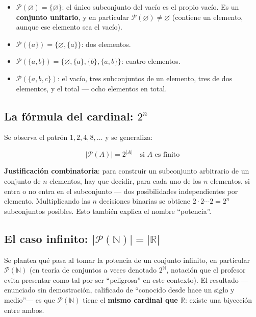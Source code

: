 \documentclass[12pt,a4paper]{article}
\begin{document}
\begin{itemize}
  \item $\mathcal{P}(\varnothing) = \{\varnothing\}$: el único subconjunto del vacío es el propio vacío. Es un \textbf{conjunto unitario}, y en particular $\mathcal P(\varnothing) \ne \varnothing$ (contiene un elemento, aunque ese elemento sea el vacío).
  \item $\mathcal P(\{a\}) = \{\varnothing, \{a\}\}$: dos elementos.
  \item $\mathcal P(\{a,b\}) = \{\varnothing, \{a\}, \{b\}, \{a,b\}\}$: cuatro elementos.
  \item $\mathcal P(\{a,b,c\})$: el vacío, tres subconjuntos de un elemento, tres de dos elementos, y el total — ocho elementos en total.
\end{itemize}

\subsection{La fórmula del cardinal: \texorpdfstring{$2^n$}{2\^{}n}}

Se observa el patrón $1,2,4,8,\dots$ y se generaliza:

\begin{keybox}
$$\boxed{|\mathcal P(A)| = 2^{|A|} \quad \text{si } A \text{ es finito}}$$
\end{keybox}

\textbf{Justificación combinatoria}: para construir un subconjunto arbitrario de un conjunto de $n$ elementos, hay que decidir, para cada uno de los $n$ elementos, si entra o no entra en el subconjunto — dos posibilidades independientes por elemento. Multiplicando las $n$ decisiones binarias se obtiene $2\cdot 2 \cdots 2 = 2^n$ subconjuntos posibles. Esto también explica el nombre ``potencia''.

\subsection{El caso infinito: \texorpdfstring{$|\mathcal P(\mathbb N)| = |\mathbb R|$}{|P(N)|=|R|}}

Se plantea qué pasa al tomar la potencia de un conjunto infinito, en particular $\mathcal P(\mathbb N)$ (en teoría de conjuntos a veces denotado $2^{\mathbb N}$, notación que el profesor evita presentar como tal por ser ``peligrosa'' en este contexto). El resultado —enunciado sin demostración, calificado de ``conocido desde hace un siglo y medio''— es que $\mathcal P(\mathbb N)$ tiene el \textbf{mismo cardinal que $\mathbb R$}: existe una biyección entre ambos.
\end{document}
